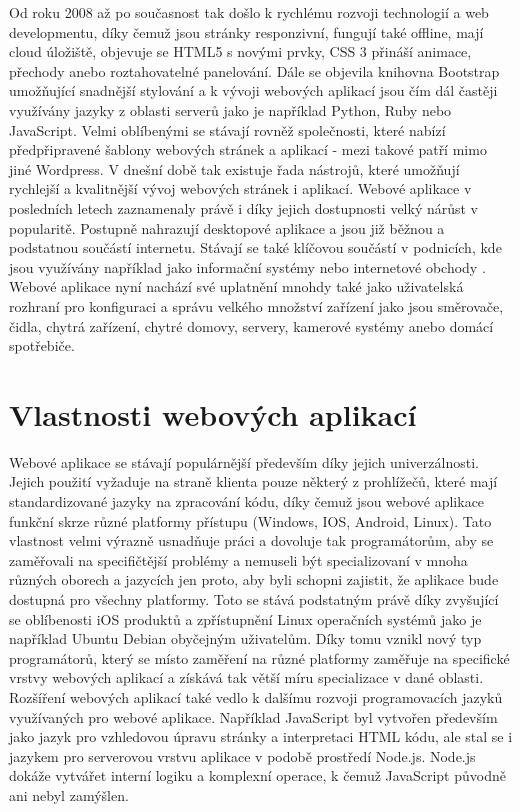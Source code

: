 Od roku 2008 až po současnost tak došlo k rychlému rozvoji technologií a web developmentu, díky čemuž jsou stránky responzivní, fungují také offline, mají cloud úložiště, objevuje se HTML5 s novými prvky, CSS 3 přináší animace, přechody anebo roztahovatelné panelování. Dále se objevila knihovna Bootstrap umožňující snadnější stylování a k vývoji webových aplikací jsou čím dál častěji využívány jazyky z oblasti serverů jako je například Python, Ruby nebo JavaScript. Velmi oblíbenými se stávají rovněž společnosti, které nabízí předpřipravené šablony webových stránek a aplikací - mezi takové patří mimo jiné Wordpress. V dnešní době tak existuje řada nástrojů, které umožňují rychlejší a kvalitnější vývoj webových stránek i aplikací. Webové aplikace v posledních letech zaznamenaly právě i díky jejich dostupnosti velký nárůst v popularitě. Postupně nahrazují desktopové aplikace a jsou již běžnou a podstatnou součástí internetu. Stávají se také klíčovou součástí v podnicích, kde jsou využívány například jako informační systémy nebo internetové obchody \cite{understandwebapps}. Webové aplikace nyní nachází své uplatnění mnohdy také jako uživatelská rozhraní pro konfiguraci a správu velkého množství zařízení jako jsou směrovače, čidla, chytrá zařízení, chytré domovy, servery, kamerové systémy anebo domácí spotřebiče.

    \section{Vlastnosti webových aplikací}
Webové aplikace se stávají populárnější především díky jejich univerzálnosti. Jejich použití vyžaduje na straně klienta pouze některý z prohlížečů, které mají standardizované jazyky na zpracování kódu, díky čemuž jsou webové aplikace funkční skrze různé platformy přístupu (Windows, IOS, Android, Linux). Tato vlastnost velmi výrazně usnadňuje práci a dovoluje tak programátorům, aby se zaměřovali na specifičtější problémy a nemuseli být specializovaní v mnoha různých oborech a jazycích jen proto, aby byli schopni zajistit, že aplikace bude dostupná pro všechny platformy. Toto se stává podstatným právě díky zvyšující se oblíbenosti iOS produktů a zpřístupnění Linux operačních systémů jako je například Ubuntu Debian obyčejným uživatelům. Díky tomu vznikl nový typ programátorů, který se místo zaměření na různé platformy zaměřuje na specifické vrstvy webových aplikací a získává tak větší míru specializace v dané oblasti. Rozšíření webových aplikací také vedlo k dalšímu rozvoji programovacích jazyků využívaných pro webové aplikace. Například JavaScript byl vytvořen především jako jazyk pro vzhledovou úpravu stránky a interpretaci HTML kódu, ale stal se i jazykem pro serverovou vrstvu aplikace v podobě prostředí Node.js. Node.js dokáže vytvářet interní logiku a komplexní operace, k čemuž JavaScript původně ani nebyl zamýšlen.

